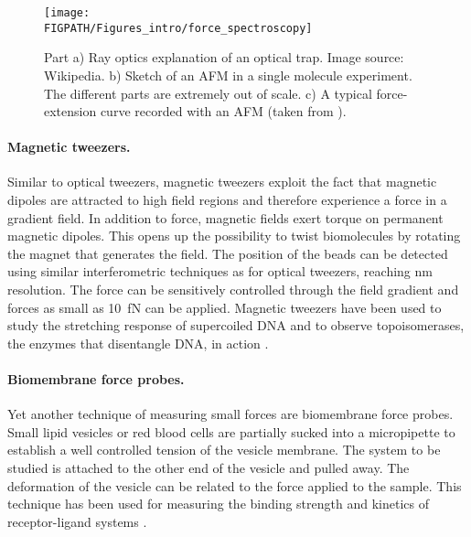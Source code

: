 \begin{figure}
\centering
\texttt{[image: \\FIGPATH/Figures\_intro/force\_spectroscopy]}
\caption[Sketch of an optical trap and an AFM.]{\label{fig:force_spectroscopy}
Part a) Ray optics explanation of an optical trap. Image source: Wikipedia. b) Sketch of an AFM in a single molecule experiment. The different parts are extremely out of scale. c) A typical force-extension curve recorded with an AFM 
(taken from ).
}
\end{figure}

\paragraph{Magnetic tweezers.}
Similar to optical tweezers, magnetic tweezers exploit the fact that magnetic dipoles are attracted to high 
field regions and therefore experience a force in a gradient field. In addition to force, magnetic
fields exert torque on permanent magnetic dipoles. This opens up the possibility to twist biomolecules
by rotating the magnet that generates the field. The position of the beads can be detected using 
similar interferometric techniques as for optical tweezers, reaching nm resolution. The force 
can be sensitively controlled through the field gradient and forces as small as 10~fN can be applied. 
Magnetic tweezers have been used to study the stretching response of supercoiled DNA \cite{Strick_Science_96}
and to observe topoisomerases, the enzymes that disentangle DNA, in action \cite{Strick_Nature_00}.

\paragraph{Biomembrane force probes.}
Yet another technique of measuring small forces are biomembrane force probes. 
Small lipid vesicles or red blood cells are partially sucked into a micropipette to establish a 
well controlled tension of the vesicle membrane. The system to be studied is attached 
to the other end of the vesicle and pulled away. The deformation of the vesicle
can be related to the force applied to the sample. This technique has been used
for measuring the binding strength and kinetics of receptor-ligand systems \cite{Merkel_Nature_99}. 

